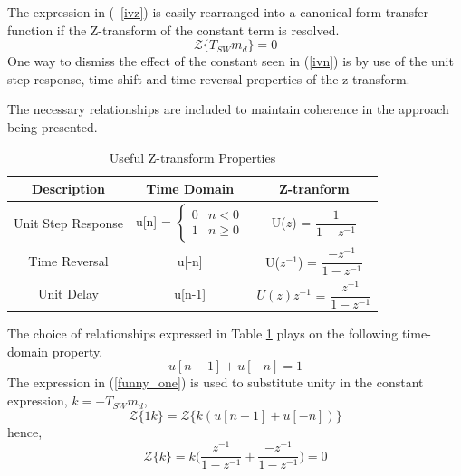 \documentclass[conference]{IEEEtran}
\begin{document}
The expression in (~\ref{ivz}) is easily rearranged into a canonical form transfer function if the Z-transform of the constant term is resolved.
\begin{equation}
 \mathcal{Z} \{ T_{SW} m_d \} = 0 \label{zconst}
\end{equation}
One way to dismiss the effect of the constant seen in (\ref{ivn}) is by use of the unit step response, time shift and time reversal properties of the z-transform.

The necessary relationships are included to maintain coherence in the approach being presented.

\begin{table}[H]
	\caption{Useful Z-transform Properties}
	\begin{center}
		\begin{tabular}{|c|c|c|}
			\hline
			\textbf{Description}& \textbf{Time Domain}& \textbf{Z-tranform}\\
			\hline
			Unit Step Response & 
			u[n] =
			$ \begin{cases} 
				0 & n < 0 \\
				1 & n \geq 0 
			\end{cases} $ 
			 & U($ \mathit{z} $) = $\dfrac{1}{1-z^{-1}}$ \\
			\hline
			
			
			Time Reversal& u[-n]& U($ \mathit{z^{-1}} $) = $\dfrac{-z^{-1}}{1-z^{-1}}$  \\
			\hline
			Unit Delay & u[n-1] & $U( \mathit{z} )\mathit{z^{-1}}$ = $\dfrac{z^{-1}}{1-z^{-1}}$  \\
			\hline

		\end{tabular}
		\label{tabun}
	\end{center}
\end{table}

The choice of relationships expressed in Table \ref{tabun} plays on the following time-domain property. 
\begin{equation}
u[n-1] + u[-n] = 1 \label{funny_one}
\end{equation}
The expression in (\ref{funny_one}) is used to substitute unity in the constant expression, $ k = -T_{SW} m_d $,
\begin{equation}
	\mathcal{Z}\{ 1k \} = 
	\mathcal{Z}\{ k (u[n-1] + u[-n]) \}
\end{equation}
hence,
\begin{equation}
\mathcal{Z}\{ k \} = k \bigg( \dfrac{z^{-1}}{1-z^{-1}} + \dfrac{-z^{-1}}{1-z^{-1}} \bigg) = 0
\end{equation}
\end{document}
